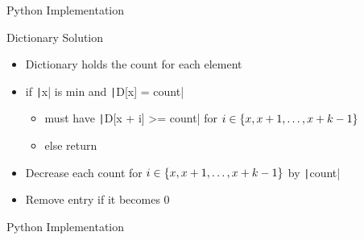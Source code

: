 \begin{frame}{Python Implementation}
    \pause
\end{frame}

\begin{frame}{Dictionary Solution}
    \pause
    \begin{itemize}[<+->]
        \item Dictionary holds the count for each element
        \item if \texttt|x| is min and \texttt|D[x] = count|
              \begin{itemize}[<+->]
                  \item must have \texttt|D[x + i] >= count| for $i\in\left\lbrace x, x + 1, \dots, x + k - 1\right\rbrace$
                  \item else return \PyFalse
              \end{itemize}
        \item Decrease each count for $i\in\left\lbrace x, x + 1, \dots, x + k - 1\right\rbrace$ by \texttt|count|
        \item Remove entry if it becomes 0
    \end{itemize}
\end{frame}

\begin{frame}{Python Implementation}
    \pause
\end{frame}